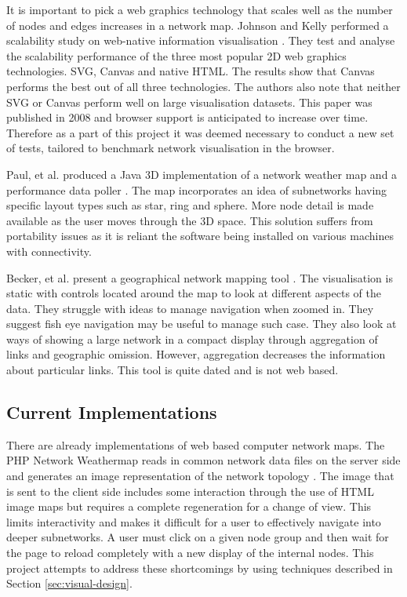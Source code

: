 \documentclass[11pt, a4paper]{article}
\begin{document}
It is important to pick a web graphics technology that scales well as the number
of nodes and edges increases in a network map. Johnson and Kelly performed a
scalability study on web-native information visualisation \cite{Johnson_2008}.
They test and analyse the scalability performance of the three most popular 2D
web graphics technologies. SVG, Canvas and native HTML. The results
show that Canvas performs the best out of all three technologies. The authors
also note that neither SVG or Canvas perform well on large visualisation
datasets. This paper was published in 2008 and browser support is anticipated to
increase over time. Therefore as a part of this project it was deemed necessary
to conduct a new set of tests, tailored to benchmark network visualisation in the
browser.


Paul, et al. produced a Java 3D implementation of a network weather map and a
performance data poller \cite{Paul_2000}. The map incorporates an idea of
subnetworks having specific layout types such as star, ring and sphere. More
node detail is made available as the user moves through the 3D space. This
solution suffers from portability issues as it is reliant the software being
installed on various machines with connectivity.

Becker, et al. present a geographical network mapping tool \cite{Becker_1995}.
The visualisation is static with controls located around the map to look at
different aspects of the data. They struggle with ideas to manage navigation
when zoomed in. They suggest fish eye navigation may be useful to manage such
case. They also look at ways of showing a large network in a compact display
through aggregation of links and geographic omission. However, aggregation
decreases the information about particular links. This tool is quite dated and
is not web based.


\subsection{Current Implementations}
\label{sec:current-implementations}

There are already implementations of web based computer network maps. The PHP
Network Weathermap reads in common network data files on the server side and
generates an image representation of the network topology
\cite{PHP_Network_Weathermap_website}. The image that is sent to the client side
includes some interaction through the use of HTML image maps but requires a
complete regeneration for a change of view. This limits interactivity and makes
it difficult for a user to effectively navigate into deeper subnetworks. A user
must click on a given node group and then wait for the page to reload completely
with a new display of the internal nodes. This project attempts to address
these shortcomings by using techniques described in Section
\ref{sec:visual-design}. 
\end{document}
